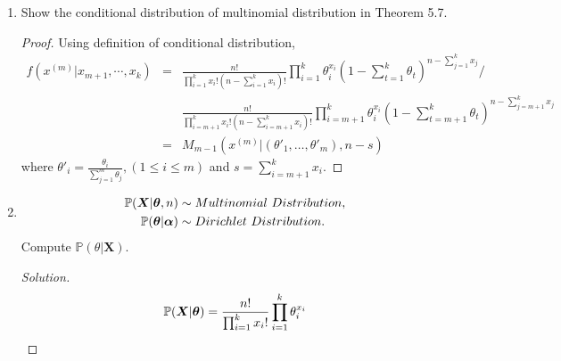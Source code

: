 \documentclass[10pt,a4paper]{article}
\def\BP{{\mathbb P}}
\def\tha{\mbox{\boldmath$\theta$\unboldmath}}
\def\aph{\mbox{\boldmath$\alpha$\unboldmath}}
\def\X{{\bm X}}
\begin{document}
\begin{enumerate}
\begin{proof}[Solution]
\begin{eqnarray*}
&&d\alpha\wedge dw\wedge du\wedge d(\sigma^2)\wedge d\beta\wedge dr +\\
&&w\left(\sqrt{\frac{1-\alpha}{\alpha}}+\sqrt{\frac{\alpha}{1-\alpha}}\right)\left[\sigma\left(\frac{-r(1-\beta^2)^2\sigma^2}{\alpha(1-\alpha)}-\frac{(1-r)(1-\beta^2)^2\sigma^2}{\alpha(1-\alpha)}\right)\right] \\
&&d\alpha\wedge dw\wedge du\wedge d\beta \wedge d(\sigma^2)\wedge dr \\
&=&w\left(\sqrt{\frac{1-\alpha}{\alpha}}+\sqrt{\frac{\alpha}{1-\alpha}}\right)\frac{(1-\beta)^2\sigma^3}{\alpha(1-\alpha)}d\alpha\wedge dw\wedge du\wedge d(\sigma^2)\wedge d\beta\wedge dr\\
&=&-w\left(\sqrt{\frac{1-\alpha}{\alpha}}+\sqrt{\frac{\alpha}{1-\alpha}}\right)\frac{(1-\beta)^2\sigma^3}{\alpha(1-\alpha)}dw\wedge du\wedge d(\sigma^2)\wedge d\alpha\wedge d\beta\wedge dr
\end{eqnarray*}
So, $$\det(J) = -w\left(\sqrt{\frac{1-\alpha}{\alpha}}+\sqrt{\frac{\alpha}{1-\alpha}}\right)\frac{(1-\beta)^2\sigma^3}{\alpha(1-\alpha)}$$
\end{proof}
\item
Show the conditional distribution of multinomial distribution in Theorem 5.7.
\begin{proof}
Using definition of conditional distribution,
\begin{eqnarray*}
f(x^{(m)}|x_{m+1},\cdots,x_k) &=&\frac{n!}{\prod_{i=1}^k x_i!(n-\sum_{i=1}^k x_i)!}\prod_{i=1}^k \theta_i^{x_i} (1-\sum_{t=1}^k\theta_t)^{n-\sum_{j=1}^kx_j} / \\
&&\frac{n!}{\prod_{i=m+1}^k x_i!(n-\sum_{i=m+1}^k x_i)!}\prod_{i=m+1}^k \theta_i^{x_i} (1-\sum_{t=m+1}^k\theta_t)^{n-\sum_{j=m+1}^kx_j} \\
&=& M_{m-1}(x^{(m)}|(\theta'_1,\dots, \theta'_m),n-s)
\end{eqnarray*}
where $\theta'_i = \frac{\theta_i}{\sum_{j=1}^{m}\theta_j}, (1\leq i\leq m)$ and $s=\sum_{i=m+1}^{k}x_i$.
\end{proof}
\item
\begin{align*}
	\BP(\X|\tha,n)		&\sim Multinomial\ Distribution,\\
	\BP(\tha|\aph) 	&\sim Dirichlet\ Distribution.
\end{align*}
Compute $\BP(\theta|\X)$.
\begin{proof}[Solution]\let\qed\relax
\begin{equation*}
			\BP(\X|\tha) = \frac{n!}{\prod_{i=1}^k x_i!}\prod_{i=1}^k \theta_i^{x_i}

\end{equation*}
\end{proof}
\end{enumerate}
\end{document}
